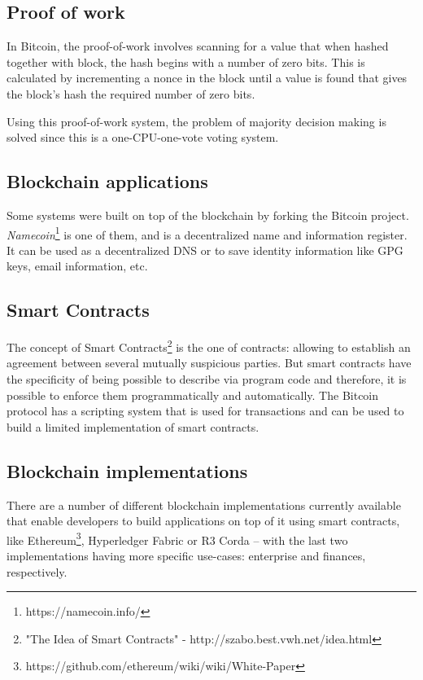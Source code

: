 \subsection{Proof of work}
In Bitcoin, the proof-of-work involves scanning for a value that when hashed together with block, the hash begins with a number of zero bits. This is calculated by incrementing a nonce in the block until a value is found that gives the block's hash the required number of zero bits.

Using this proof-of-work system, the problem of majority decision making is solved since this is a one-CPU-one-vote voting system.

\subsection{Blockchain applications}
Some systems were built on top of the blockchain by forking the Bitcoin project.
\textit{Namecoin}\footnote{https://namecoin.info/} is one of them, and is a decentralized name and information register. It can be used as a decentralized DNS or to save identity information like GPG keys, email information, etc.

\subsection{Smart Contracts} The concept of Smart Contracts\footnote{"The Idea of Smart Contracts" - http://szabo.best.vwh.net/idea.html}\cite{40673} is the one of contracts: allowing to establish an agreement between several mutually suspicious parties. But smart contracts have the specificity of being possible to describe via program code and therefore, it is possible to enforce them programmatically and automatically.
The Bitcoin protocol has a scripting system that is used for transactions and can be used to build a limited implementation of smart contracts.


\subsection{Blockchain implementations}

There are a number of different blockchain implementations currently available that enable developers to build applications on top of it using smart contracts, like Ethereum\footnote{https://github.com/ethereum/wiki/wiki/White-Paper}, Hyperledger Fabric\cite{cachin2016architecture} or R3 Corda\cite{mikehearn2016} – with the last two implementations having more specific use-cases: enterprise and finances, respectively.

